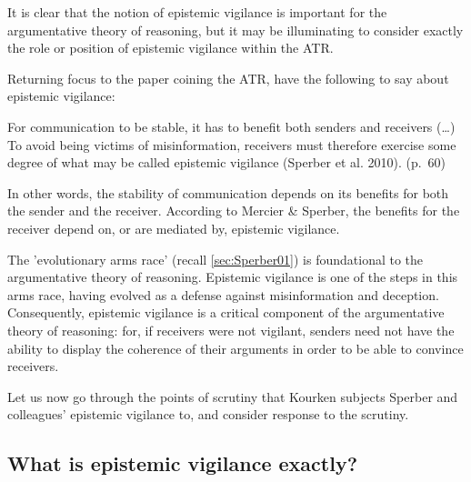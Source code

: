 It is clear that the notion of epistemic vigilance is important for the argumentative theory of reasoning, but it may be illuminating to consider exactly the role or position of epistemic vigilance within the ATR.

Returning focus to the paper coining the ATR, \citet{MS11} have the following to say about epistemic vigilance:

\begin{quoting}
    For communication to be stable, it has to benefit both senders and receivers (\ldots) To avoid being victims of misinformation, receivers must therefore exercise some degree of what may be called epistemic vigilance (Sperber et al. 2010).
\hfill (p.~60)
\end{quoting}
In other words, the stability of communication depends on its benefits for both the sender and the receiver. According to Mercier \& Sperber, the benefits for the receiver depend on, or are mediated by, epistemic vigilance.

The 'evolutionary arms race' (recall \cref{sec:Sperber01}) is foundational to the argumentative theory of reasoning. Epistemic vigilance is one of the steps in this arms race, having evolved as a defense against misinformation and deception. Consequently, epistemic vigilance is a critical component of the argumentative theory of reasoning: for, if receivers were not vigilant, senders need not have the ability to display the coherence of their arguments in order to be able to convince receivers.

Let us now go through the points of scrutiny that Kourken \citet{Michaelian13} subjects Sperber and colleagues' epistemic vigilance to, and consider  response to the scrutiny.

\subsection{What is epistemic vigilance exactly?}
\label{sec:EV-def}

